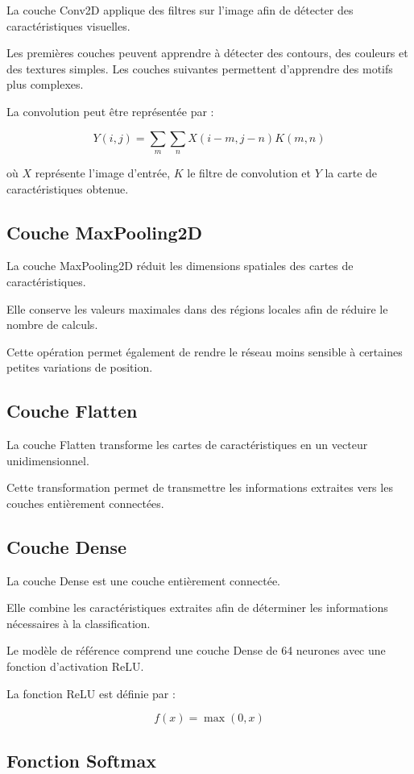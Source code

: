 \documentclass[12pt,a4paper,oneside]{report}
\begin{document}
La couche Conv2D applique des filtres sur l'image
afin de détecter des caractéristiques visuelles.

Les premières couches peuvent apprendre à détecter
des contours, des couleurs et des textures simples.
Les couches suivantes permettent d'apprendre des motifs
plus complexes.

La convolution peut être représentée par :

\[
Y(i,j)=\sum_m\sum_n X(i-m,j-n)K(m,n)
\]

où $X$ représente l'image d'entrée, $K$ le filtre
de convolution et $Y$ la carte de caractéristiques obtenue.

\subsection{Couche MaxPooling2D}

La couche MaxPooling2D réduit les dimensions spatiales
des cartes de caractéristiques.

Elle conserve les valeurs maximales dans des régions
locales afin de réduire le nombre de calculs.

Cette opération permet également de rendre le réseau
moins sensible à certaines petites variations de position.

\subsection{Couche Flatten}

La couche Flatten transforme les cartes de caractéristiques
en un vecteur unidimensionnel.

Cette transformation permet de transmettre les
informations extraites vers les couches entièrement
connectées.

\subsection{Couche Dense}

La couche Dense est une couche entièrement connectée.

Elle combine les caractéristiques extraites afin
de déterminer les informations nécessaires à la
classification.

Le modèle de référence comprend une couche Dense
de 64 neurones avec une fonction d'activation ReLU.

La fonction ReLU est définie par :

\[
f(x)=\max(0,x)
\]

\subsection{Fonction Softmax}
\end{document}
